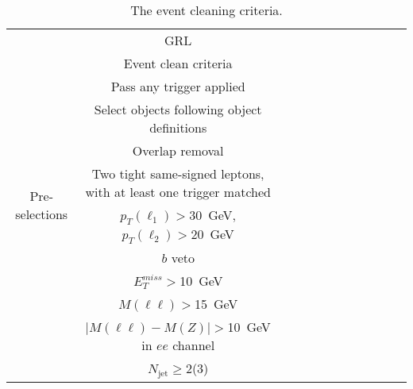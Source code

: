 \begin{table}
\centering
\small
\begin{tabular}{c|ccccccccccc}
\hline
\hline
\multirow{12}{2cm}{Pre-selections} &GRL \\
                                  &Event clean criteria\\
                                  &Pass any trigger applied \\
                                  &Select objects following object definitions\\
                                  &Overlap removal \\
                                  &Two tight same-signed leptons, with at least one trigger matched \\
                                  &$p_T(\ell_1) >30$~GeV, $p_T(\ell_2)>20$~GeV \\
                                  &$b$ veto \\
                                  &$E_T^{miss}>$10~GeV \\
                                  &$M(\ell\ell)>$15~GeV \\
                                  &$|M(\ell\ell)-M(Z)|>$10~GeV in $ee$ channel\\
                                  &$N_\text{jet}\geq$2(3) \\
\hline
\hline
\end{tabular}
\caption{The event cleaning criteria.}
\label{tab:4w_evt_presel}
\end{table}
